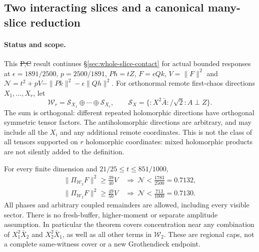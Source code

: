 \subsection{Two interacting slices and a canonical many-slice reduction}
\label{sec:two-slice-contact}

\paragraph{Status and scope.}
This \st{P,C} result continues \S\ref{sec:whole-slice-contact} for
actual bounded responses at $\epsilon=1891/2500$, $p=2500/1891$,
$Ph=tZ$, $F=\epsilon Qk$, $V=\|F\|^2$ and
$\mathcal N=t^2+pV-\|Pk\|^2-\epsilon\|Qh\|^2$.
For orthonormal remote first-chaos directions $X_1,\ldots,X_r$, let
\[
 \mathcal W_r=\mathcal S_{X_1}\oplus\cdots\oplus\mathcal S_{X_r},
 \qquad \mathcal S_X=\{{:}X^2\bar A{:}/\sqrt2:A\perp Z\}.
\]
The sum is orthogonal: different repeated holomorphic directions
have orthogonal symmetric tensor factors. The antiholomorphic
directions are arbitrary, and may include all the $X_i$ and any
additional remote coordinates. This is not the class of all tensors
supported on $r$ holomorphic coordinates: mixed holomorphic products
are not silently added to the definition.

\begin{theorem}
\label{thm:two-slice-contact}
For every finite dimension and $21/25\le t\le851/1000$,
\[
 \boxed{\begin{aligned}
 \|\Pi_{\mathcal W_2}F\|^2\ge\frac{39}{40}V
       &\ \Longrightarrow\ \mathcal N<\frac{1783}{2500}=0.7132,\\
 \|\Pi_{\mathcal W_2}F\|^2\ge\frac{49}{50}V
       &\ \Longrightarrow\ \mathcal N<\frac{713}{1000}=0.7130.
 \end{aligned}}
\]
All phases and arbitrary coupled remainders are allowed, including
every visible sector. There is no fresh-buffer, higher-moment or
separate amplitude assumption. In particular the theorem covers
concentration near any combination of $X_1^2\bar X_2$ and
$X_2^2\bar X_1$, as well as all other terms in $\mathcal W_2$.
These are regional caps, not a complete same-witness cover or a new
Grothendieck endpoint.
\end{theorem}

